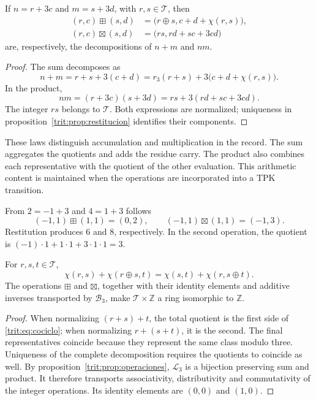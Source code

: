 \begin{proposicion}
\label{trit:prop:operaciones}
If \(n=r+3c\) and \(m=s+3d\), with \(r,s\in\mathcal T\), then
\begin{align}
 (r,c)\boxplus(s,d)
 &=\bigl(r\oplus s,c+d+\chi(r,s)\bigr),
 \label{trit:eq:suma}\\
 (r,c)\boxtimes(s,d)
 &=\bigl(rs,rd+sc+3cd\bigr)
 \label{trit:eq:producto}
\end{align}
are, respectively, the decompositions of \(n+m\) and \(nm\).
\end{proposicion}
\begin{proof}
The sum decomposes as
\[
 n+m=r+s+3(c+d)
     =r_3(r+s)+3\bigl(c+d+\chi(r,s)\bigr).
\]
In the product,
\[
 nm=(r+3c)(s+3d)=rs+3(rd+sc+3cd).
\]
The integer \(rs\) belongs to \(\mathcal T\). Both expressions are
normalized; uniqueness in proposition~\ref{trit:prop:restitucion}
identifies their components.
\end{proof}

These laws distinguish accumulation and multiplication in the record.
The sum aggregates the quotients and adds the residue carry. The product
also combines each representative with the quotient of the other evaluation.
This arithmetic content is maintained when the operations are incorporated
into a TPK transition.

\begin{ejemplo}
From \(2=-1+3\) and
\(4=1+3\) follows
\[
 (-1,1)\boxplus(1,1)=(0,2),\qquad
 (-1,1)\boxtimes(1,1)=(-1,3).
\]
Restitution produces \(6\) and \(8\), respectively. In the second
operation, the quotient is \((-1)\cdot1+1\cdot1+3\cdot1\cdot1=3\).
\end{ejemplo}

\begin{proposicion}
\label{trit:prop:cociclo}
For \(r,s,t\in\mathcal T\),
\begin{equation}
 \chi(r,s)+\chi(r\oplus s,t)
 =\chi(s,t)+\chi(r,s\oplus t).
\label{trit:eq:cociclo}
\end{equation}
The operations \(\boxplus\) and \(\boxtimes\), together with their identity
elements and additive inverses transported by \(\mathcal B_3\), make
\(\mathcal T\times\mathbb Z\) a ring isomorphic to \(\mathbb Z\).
\end{proposicion}
\begin{proof}
When normalizing \((r+s)+t\), the total quotient is the first side of
\eqref{trit:eq:cociclo}; when normalizing \(r+(s+t)\), it is the second.
The final representatives coincide because they represent the same class
modulo three. Uniqueness of the complete decomposition requires the
quotients to coincide as well. By proposition~\ref{trit:prop:operaciones},
\(\mathcal L_3\) is a bijection preserving sum and product. It therefore transports
associativity, distributivity and commutativity of the
integer operations. Its identity elements are \((0,0)\) and \((1,0)\).
\end{proof}

